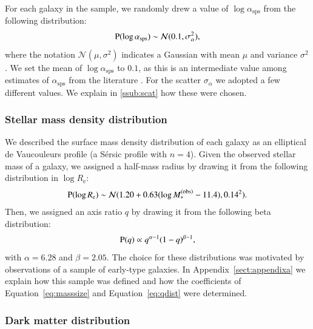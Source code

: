 \documentclass{aa}
\def\reff{R_{\mathrm{e}}}
\def\asps{\alpha_{\mathrm{sps}}}
\def\mobs{M_*^{(\mathrm{obs})}}
\def\Eref#1{Equation~\ref{#1}\xspace}
\def\pr{{\rm P}}
\begin{document}
For each galaxy in the sample, we randomly drew a value of $\log{\asps}$ from the following distribution:
\begin{equation}
\pr(\log{\asps}) \sim \mathcal{N}(0.1, \sigma_\alpha^2),
\end{equation}
where the notation $\mathcal{N}(\mu,\sigma^2)$ indicates a Gaussian with mean $\mu$ and variance $\sigma^2$.
We set the mean of $\log{\asps}$ to $0.1$, as this is an intermediate value among estimates of $\asps$ from the literature \citep{CvD12, Cap++13, SLC15, Son++15, Son++19}.
For the scatter $\sigma_\alpha$ we adopted a few different values. We explain in \ref{ssub:scat} how these were chosen.


\subsubsection{Stellar mass density distribution}

We described the surface mass density distribution of each galaxy as an elliptical de Vaucouleurs profile (a S\'{e}rsic profile with $n=4$).
Given the observed stellar mass of a galaxy, we assigned a half-mass radius by drawing it from the following distribution in $\log{\reff}$:
\begin{equation}\label{eq:masssize}
\pr(\log{\reff}) \sim \mathcal{N}(1.20 + 0.63(\log{\mobs} - 11.4), 0.14^2).
\end{equation}
Then, we assigned an axis ratio $q$ by drawing it from the following beta distribution:
\begin{equation}\label{eq:qdist}
\pr(q) \propto q^{\alpha-1}(1 - q)^{\beta-1},
\end{equation}
with $\alpha=6.28$ and $\beta=2.05$.
The choice for these distributions was motivated by observations of a sample of early-type galaxies. In Appendix~\ref{sect:appendixa} we explain how this sample was defined and how the coefficients of \Eref{eq:masssize} and \Eref{eq:qdist} were determined. 

\subsubsection{Dark matter distribution}
\end{document}

